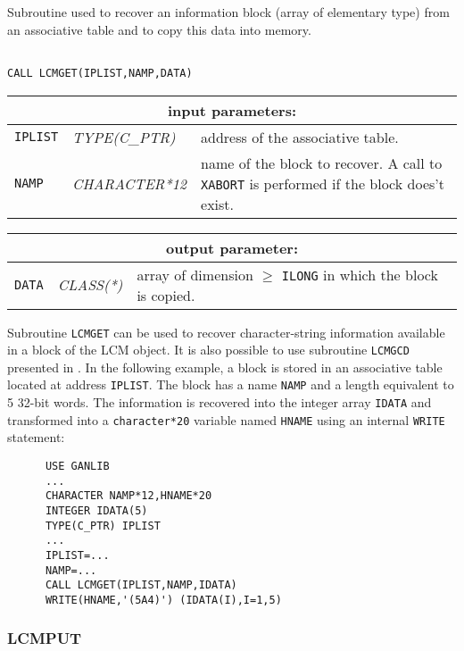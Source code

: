 Subroutine used to recover an information block (array of elementary type) from an associative table and to copy
this data into memory.

\begin{verbatim}

CALL LCMGET(IPLIST,NAMP,DATA)
\end{verbatim}

\noindent
\begin{tabular}{|p{1.5cm}|p{3cm}|p{10cm}|}
\hline
\multicolumn{3}{|c|}{\bf input parameters:} \\
\hline
{\tt IPLIST} & {\it TYPE(C\_PTR)} & address of the associative table. \\
\hline
{\tt NAMP} & {\it CHARACTER*12} &  name of the block to recover. 
                                    A call to {\tt XABORT} is performed if the block does't exist. \\
\hline
\end{tabular}

\vskip 0.8cm

\noindent
\begin{tabular}{|p{1.5cm}|p{3cm}|p{10cm}|}
\hline
\multicolumn{3}{|c|}{\bf output parameter:} \\
\hline
{\tt DATA} & {\it CLASS(*)} & array of dimension $\ge$ {\tt ILONG} in which the block is copied. \\
\hline
\end{tabular}

\vskip 0.4cm

Subroutine {\tt LCMGET} can be used to recover character-string information available in a block
of the LCM object. It is also possible to use subroutine {\tt LCMGCD} presented in .
In the following example, a block is stored in an associative table located at
address {\tt IPLIST}. The block has a name {\tt NAMP} and a length equivalent to 5 32-bit words.
The information is recovered into the integer array {\tt IDATA} and transformed into a {\tt character*20} variable named {\tt HNAME} using an internal {\tt WRITE} statement:

\begin{verbatim}
      USE GANLIB
      ...
      CHARACTER NAMP*12,HNAME*20
      INTEGER IDATA(5)
      TYPE(C_PTR) IPLIST
      ...
      IPLIST=...
      NAMP=...
      CALL LCMGET(IPLIST,NAMP,IDATA)
      WRITE(HNAME,'(5A4)') (IDATA(I),I=1,5)
\end{verbatim}

\subsubsection{LCMPUT}

